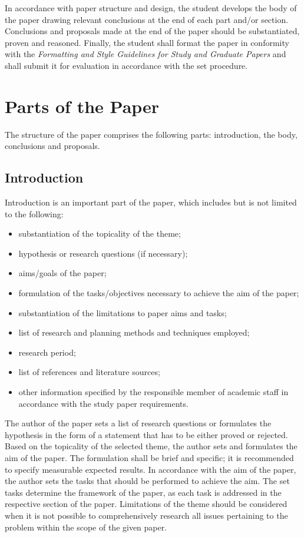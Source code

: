 In accordance with paper structure and design, the student develops the body of the paper drawing relevant conclusions at the end of each part and/or section. Conclusions and proposals made at the end of the paper should be substantiated, proven and reasoned. Finally, the student shall format the paper in conformity with the \emph{Formatting and Style Guidelines for Study and Graduate Papers} and shall submit it for evaluation in accordance with the set procedure.

\section{Parts of the Paper}

The structure of the paper comprises the following parts: introduction, the body, conclusions and proposals.

\subsection{Introduction}

Introduction is an important part of the paper, which includes but is not limited to the following:
\begin{itemize}
  \item substantiation of the topicality of the theme;
  \item hypothesis or research questions (if necessary);
  \item aims/goals of the paper;
  \item formulation of the tasks/objectives necessary to achieve the aim of the paper;
  \item substantiation of the limitations to paper aims and tasks;
  \item list of research and planning methods and techniques employed;
  \item research period;
  \item list of references and literature sources;
  \item other information specified by the responsible member of academic staff in accordance with the study paper requirements.
\end{itemize}

The author of the paper sets a list of research questions or formulates the hypothesis in the form of a statement that has to be either proved or rejected. Based on the topicality of the selected theme, the author sets and formulates the aim of the paper. The formulation shall be brief and specific; it is recommended to specify measurable expected results. In accordance with the aim of the paper, the author sets the tasks that should be performed to achieve the aim. The set tasks determine the framework of the paper, as each task is addressed in the respective section of the paper. Limitations of the theme should be considered when it is not possible to comprehensively research all issues pertaining to the problem within the scope of the given paper.

